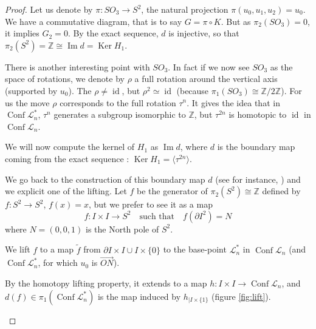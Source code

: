 \documentclass[11pt]{amsart}
\begin{document}
\begin{proof}
Let us denote by $\pi : SO_3 \to S^2$,  the natural projection 
$\pi(u_0,u_1,u_2) = u_0$. 
We have a commutative diagram, that is to say $G = \pi \circ K$.
But as $\pi_2(SO_3) = 0$, it implies $G_2 = 0$. By the exact sequence, $d$ is injective, so that
$\pi_2(S^2) = {\mathbb{Z}} \cong {\mathop{\mathrm{Im}}\nolimits} d = {\mathop{\mathrm{Ker}}\nolimits} H_1$.

There is another interesting point with $SO_3$. In fact if we now see $SO_3$ 
as the space of rotations, we denote 
by $\rho$ a full rotation around the vertical axis (supported by $u_0$).
The $\rho \neq {\mathop{\mathrm{id}}\nolimits}$, but $\rho^2 \simeq {\mathop{\mathrm{id}}\nolimits}$ (because $\pi_1(SO_3) \cong {\mathbb{Z}}/2{\mathbb{Z}}$).
For us the move $\rho$ corresponds to the full rotation $\tau^n$. 
It gives the idea that in ${\mathop{\mathrm{Conf}}\nolimits} \mathcal{L}_n^*$, $\tau^n$ generates a subgroup isomorphic to 
 ${\mathbb{Z}}$, but $\tau^{2n}$ is homotopic to ${\mathop{\mathrm{id}}\nolimits}$ in ${\mathop{\mathrm{Conf}}\nolimits} \mathcal{L}_n$.

\bigskip
 
We will now compute the kernel of $H_1$ as ${\mathop{\mathrm{Im}}\nolimits} d$, where $d$ is the boundary map 
coming from the exact sequence : ${\mathop{\mathrm{Ker}}\nolimits} H_1 = \langle \tau^{2n} \rangle$.

We go back to the construction of this boundary map $d$ (see for instance,
\cite[Theorem 6.12]{Hu}) and we explicit one of the lifting.
Let $f$ be the generator of $\pi_2(S^2) \cong {\mathbb{Z}}$ defined by 
$f : S^2 \to S^2$, $f(x)=x$, but we prefer to see it as a map 
$$f : I \times I \to S^2 \quad \text{such that}\quad f(\partial I^2) = N$$
where $N=(0,0,1)$ is the North pole of $S^2$.

We lift $f$ to a map $\tilde f$ from $\partial I \times I \cup I \times \{0\}$
to the base-point $\mathcal{L}_n^*$ in ${\mathop{\mathrm{Conf}}\nolimits} \mathcal{L}_n$ (and ${\mathop{\mathrm{Conf}}\nolimits} \mathcal{L}_n^*$, for which 
$u_0$ is $\overrightarrow{ON}$).

By the homotopy lifting property, it extends to a map
$h : I\times I \to {\mathop{\mathrm{Conf}}\nolimits} \mathcal{L}_n$,
and $d(f) \in \pi_1({\mathop{\mathrm{Conf}}\nolimits} \mathcal{L}_n^*)$ is the map 
induced by $h_{|I\times \{1\}}$ (figure \ref{fig:lift}).

\begin{figure}
 
\begin{tikzpicture}[scale=0.5]


\end{tikzpicture}
\end{figure}
\end{proof}
\end{document}
